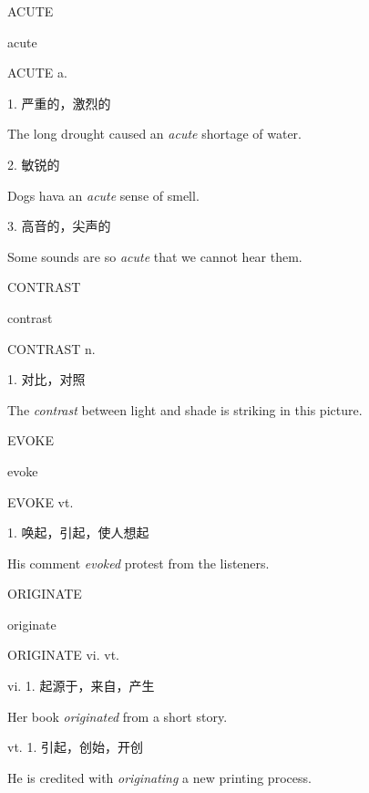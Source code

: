 \begin{flashcard}{
ACUTE

acute
}
\begin{center}
ACUTE a. 
\end{center}
1. 严重的，激烈的

The long drought caused an \textit{acute} shortage of water.

2. 敏锐的

Dogs hava an \textit{acute} sense of smell.

3. 高音的，尖声的

Some sounds are so \textit{acute} that we cannot hear them.

\end{flashcard}
\begin{flashcard}{
CONTRAST

contrast
}
\begin{center}
CONTRAST n. 
\end{center}
1. 对比，对照

The \textit{contrast} between light and shade is striking in this picture.

\end{flashcard}
\begin{flashcard}{
EVOKE

evoke
}
\begin{center}
EVOKE vt. 
\end{center}
1. 唤起，引起，使人想起

His comment \textit{evoked} protest from the listeners.

\end{flashcard}
\begin{flashcard}{
ORIGINATE

originate
}
\begin{center}
ORIGINATE vi. vt. 
\end{center}
vi. 1. 起源于，来自，产生

Her book \textit{originated} from a short story.

vt. 1. 引起，创始，开创

He is credited with \textit{originating} a new printing process.

\end{flashcard}
